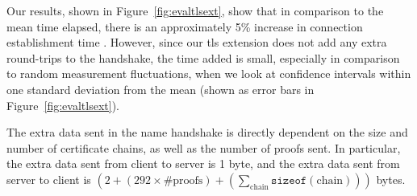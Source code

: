 Our results, shown in Figure~\ref{fig:evaltlsext}, show that in
comparison to the mean time elapsed, there is an approximately 5\%
increase in connection establishment time .
%
However, since our \ac{tls} extension does not add any extra
round-trips to the handshake, the time added is small, especially in
comparison to random measurement fluctuations, when we look at
confidence intervals within one standard deviation from the mean
(shown as error bars in Figure~\ref{fig:evaltlsext}).

The extra data sent in the \ac{name} handshake is directly dependent
on the size and number of certificate chains, as well as the number of
proofs sent. In particular, the extra data sent from client to server
is 1 byte, and the extra data sent from server to client is
$(2 + (292 \times \text{\#proofs}) +
(\sum_{\text{chain}}\texttt{sizeof}(\text{chain})))$ bytes. 


